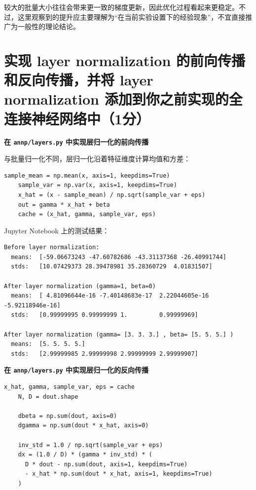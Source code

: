 较大的批量大小往往会带来更一致的梯度更新，因此优化过程看起来更稳定。不过，这里观察到的提升应主要理解为“在当前实验设置下的经验现象”，不宜直接推广为一般性的理论结论。

\section{实现 layer normalization 的前向传播和反向传播，并将 layer normalization 添加到你之前实现的全连接神经网络中（1分）}

\textbf{在 \texttt{annp/layers.py} 中实现层归一化的前向传播}

与批量归一化不同，层归一化沿着特征维度计算均值和方差：

\begin{lstlisting}[style=cleanpython]
    sample_mean = np.mean(x, axis=1, keepdims=True)
    sample_var = np.var(x, axis=1, keepdims=True)
    x_hat = (x - sample_mean) / np.sqrt(sample_var + eps)
    out = gamma * x_hat + beta
    cache = (x_hat, gamma, sample_var, eps)
\end{lstlisting}

Jupyter Notebook 上的测试结果：

\begin{lstlisting}[style=cleanpython]
Before layer normalization:
  means:  [-59.06673243 -47.60782686 -43.31137368 -26.40991744]
  stds:   [10.07429373 28.39478981 35.28360729  4.01831507]

After layer normalization (gamma=1, beta=0)
  means:  [ 4.81096644e-16 -7.40148683e-17  2.22044605e-16 -5.92118946e-16]
  stds:   [0.99999995 0.99999999 1.         0.99999969]

After layer normalization (gamma= [3. 3. 3.] , beta= [5. 5. 5.] )
  means:  [5. 5. 5. 5.]
  stds:   [2.99999985 2.99999998 2.99999999 2.99999907]
\end{lstlisting}

\textbf{在 \texttt{annp/layers.py} 中实现层归一化的反向传播}

\begin{lstlisting}[style=cleanpython]
    x_hat, gamma, sample_var, eps = cache
    N, D = dout.shape

    dbeta = np.sum(dout, axis=0)
    dgamma = np.sum(dout * x_hat, axis=0)

    inv_std = 1.0 / np.sqrt(sample_var + eps)
    dx = (1.0 / D) * (gamma * inv_std) * (
      D * dout - np.sum(dout, axis=1, keepdims=True)
      - x_hat * np.sum(dout * x_hat, axis=1, keepdims=True)
    )
\end{lstlisting}

